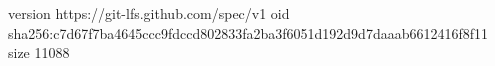 version https://git-lfs.github.com/spec/v1
oid sha256:c7d67f7ba4645ccc9fdccd802833fa2ba3f6051d192d9d7daaab6612416f8f11
size 11088
